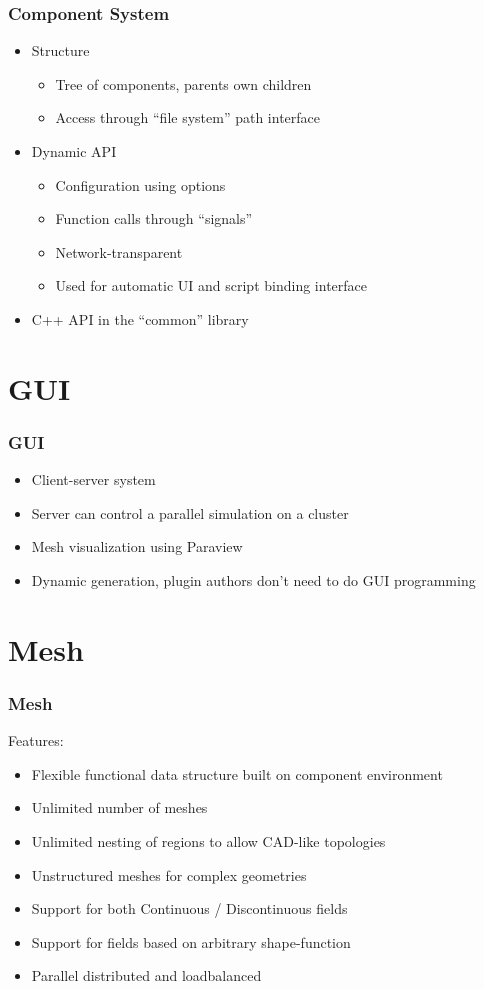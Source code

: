 \documentclass{beamer}
\begin{document}
\begin{frame}
 \frametitle{Component System}
\begin{itemize}
 \item Structure
 \begin{itemize}
  \item Tree of components, parents own children
  \item Access through ``file system'' path interface
 \end{itemize}
 \item Dynamic API
 \begin{itemize}
  \item Configuration using options
  \item Function calls through ``signals''
  \item Network-transparent
  \item Used for automatic UI and script binding interface
 \end{itemize}
 \item C++ API in the ``common'' library
\end{itemize}
\end{frame}

\section{GUI}

\begin{frame}
 \frametitle{GUI}
 \begin{itemize}
  \item Client-server system
  \item Server can control a parallel simulation on a cluster
  \item Mesh visualization using Paraview
  \item Dynamic generation, plugin authors don't need to do GUI programming
 \end{itemize}
\end{frame}

\section{Mesh}

\begin{frame}
  \frametitle{Mesh}
    Features:
    \begin{itemize}
      \item Flexible functional data structure built on component environment
      \item Unlimited number of meshes
      \item Unlimited nesting of regions to allow CAD-like topologies
      \item Unstructured meshes for complex geometries
      \item Support for both Continuous / Discontinuous fields
      \item Support for fields based on arbitrary shape-function
      \item Parallel distributed and loadbalanced
    \end{itemize}
\end{frame}
\end{document}
